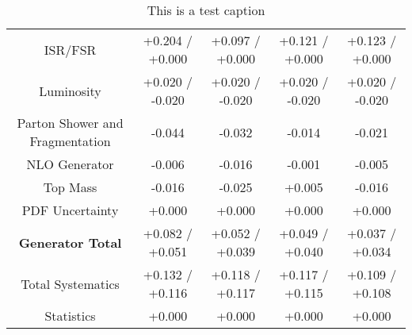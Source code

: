 \begin{table}[htbp]
\begin{center}
\begin{tabular}{|c|c|c|c|c|}
ISR/FSR                               &+0.204   / +0.000   & +0.097   / +0.000   & +0.121   / +0.000   & +0.123   / +0.000  \\
Luminosity                            &+0.020   / -0.020   & +0.020   / -0.020   & +0.020   / -0.020   & +0.020   / -0.020  \\
Parton Shower and Fragmentation       &-0.044              & -0.032              & -0.014              & -0.021             \\
NLO Generator                         &-0.006              & -0.016              & -0.001              & -0.005             \\
Top Mass                              &-0.016              & -0.025              & +0.005              & -0.016             \\
PDF Uncertainty                       &+0.000              & +0.000              & +0.000              & +0.000             \\
\hline
\textbf{Generator Total}              &+0.082   / +0.051   & +0.052   / +0.039   & +0.049   / +0.040   & +0.037   / +0.034  \\
\hline
\hline
Total Systematics                     &+0.132   / +0.116   & +0.118   / +0.117   & +0.117   / +0.115   & +0.109   / +0.108  \\
Statistics                            &+0.000              & +0.000              & +0.000              & +0.000             \\
\hline
  \end{tabular}
  \end{center} 
  \label{tab:xsec_nominal_sratio_low}
  \caption{This is a test caption}
\end{table}


 \clearpage
 
 

